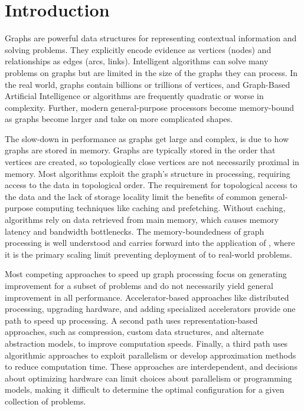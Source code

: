 \renewcommand{\thechapter}{1}
\chapter{Introduction}
\label{chapter:10-Introduction}

Graphs are powerful data structures for representing contextual information and solving problems. 
They explicitly encode evidence as vertices (nodes) and relationships as edges (arcs, links).
Intelligent algorithms can solve many problems on graphs but are limited in the size of the graphs they can process. 
In the real world, graphs contain billions or trillions of vertices, and Graph-Based Artificial Intelligence or \gai algorithms are frequently quadratic or worse in complexity.
Further, modern general-purpose processors become memory-bound as graphs become larger and take on more complicated shapes.

The slow-down in \gai performance as graphs get large and complex, is due to how graphs are stored in memory. 
Graphs are typically stored in the order that vertices are created, so topologically close vertices are not necessarily proximal in memory. 
Most \gai algorithms exploit the graph's structure in processing, requiring access to the data in topological order.
The requirement for topological access to the data and the lack of storage locality limit the benefits of common general-purpose computing techniques like caching and prefetching.
Without caching, \gai algorithms rely on data retrieved from main memory, which causes memory latency and bandwidth bottlenecks. 
The memory-boundedness of graph processing is well understood and carries forward into the application of \gai, where it is the primary scaling limit preventing deployment of \gai to real-world problems. 

Most competing approaches to speed up graph processing focus on generating improvement for a subset of problems and do not necessarily yield general improvement in all \gai performance. 
Accelerator-based approaches like distributed processing, upgrading hardware, and adding specialized accelerators provide one path to speed up processing. 
A second path uses representation-based approaches, such as compression, custom data structures, and alternate abstraction models, to improve computation speeds.
Finally, a third path uses algorithmic approaches to exploit parallelism or develop approximation methods to reduce computation time. 
These approaches are interdependent, and decisions about optimizing hardware can limit choices about parallelism or programming models, making it difficult to determine the optimal configuration for a given collection of problems. 

